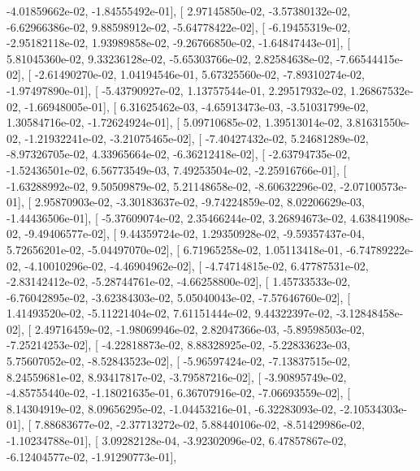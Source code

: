 \documentclass{article}
\begin{document}
         -4.01859662e-02,  -1.84555492e-01],
       [  2.97145850e-02,  -3.57380132e-02,  -6.62966386e-02,
          9.88598912e-02,  -5.64778422e-02],
       [ -6.19455319e-02,  -2.95182118e-02,   1.93989858e-02,
         -9.26766850e-02,  -1.64847443e-01],
       [  5.81045360e-02,   9.33236128e-02,  -5.65303766e-02,
          2.82584638e-02,  -7.66544415e-02],
       [ -2.61490270e-02,   1.04194546e-01,   5.67325560e-02,
         -7.89310274e-02,  -1.97497890e-01],
       [ -5.43790927e-02,   1.13757544e-01,   2.29517932e-02,
          1.26867532e-02,  -1.66948005e-01],
       [  6.31625462e-03,  -4.65913473e-03,  -3.51031799e-02,
          1.30584716e-02,  -1.72624924e-01],
       [  5.09710685e-02,   1.39513014e-02,   3.81631550e-02,
         -1.21932241e-02,  -3.21075465e-02],
       [ -7.40427432e-02,   5.24681289e-02,  -8.97326705e-02,
          4.33965664e-02,  -6.36212418e-02],
       [ -2.63794735e-02,  -1.52436501e-02,   6.56773549e-03,
          7.49253504e-02,  -2.25916766e-01],
       [ -1.63288992e-02,   9.50509879e-02,   5.21148658e-02,
         -8.60632296e-02,  -2.07100573e-01],
       [  2.95870903e-02,  -3.30183637e-02,  -9.74224859e-02,
          8.02206629e-03,  -1.44436506e-01],
       [ -5.37609074e-02,   2.35466244e-02,   3.26894673e-02,
          4.63841908e-02,  -9.49406577e-02],
       [  9.44359724e-02,   1.29350928e-02,  -9.59357437e-04,
          5.72656201e-02,  -5.04497070e-02],
       [  6.71965258e-02,   1.05113418e-01,  -6.74789222e-02,
         -4.10010296e-02,  -4.46904962e-02],
       [ -4.74714815e-02,   6.47787531e-02,  -2.83142412e-02,
         -5.28744761e-02,  -4.66258800e-02],
       [  1.45733533e-02,  -6.76042895e-02,  -3.62384303e-02,
          5.05040043e-02,  -7.57646760e-02],
       [  1.41493520e-02,  -5.11221404e-02,   7.61151444e-02,
          9.44322397e-02,  -3.12848458e-02],
       [  2.49716459e-02,  -1.98069946e-02,   2.82047366e-03,
         -5.89598503e-02,  -7.25214253e-02],
       [ -4.22818873e-02,   8.88328925e-02,  -5.22833623e-03,
          5.75607052e-02,  -8.52843523e-02],
       [ -5.96597424e-02,  -7.13837515e-02,   8.24559681e-02,
          8.93417817e-02,  -3.79587216e-02],
       [ -3.90895749e-02,  -4.85755440e-02,  -1.18021635e-01,
          6.36707916e-02,  -7.06693559e-02],
       [  8.14304919e-02,   8.09656295e-02,  -1.04453216e-01,
         -6.32283093e-02,  -2.10534303e-01],
       [  7.88683677e-02,  -2.37713272e-02,   5.88440106e-02,
         -8.51429986e-02,  -1.10234788e-01],
       [  3.09282128e-04,  -3.92302096e-02,   6.47857867e-02,
         -6.12404577e-02,  -1.91290773e-01],
\end{document}
